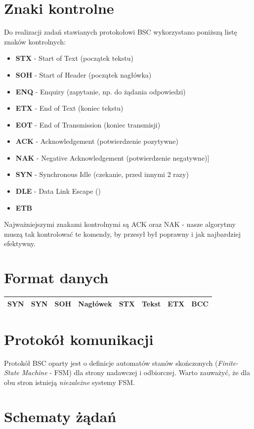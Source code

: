 \documentclass[a4paper,twoside]{article}
\begin{document}
\section{Znaki kontrolne}
Do realizacji zadań stawianych protokołowi BSC wykorzystano poniższą listę znaków kontrolnych:
\begin{itemize}
	\item \textbf{STX} - Start of Text (początek tekstu)
	\item \textbf{SOH} - Start of Header (początek nagłówka)
	\item \textbf{ENQ} - Enquiry (zapytanie, np. do żądania odpowiedzi)
	\item \textbf{ETX} - End of Text (koniec tekstu)
	\item \textbf{EOT} - End of Transmission (koniec transmisji)
	\item \textbf{ACK} - Acknowledgement (potwierdzenie pozytywne)
	\item \textbf{NAK} - Negative Acknowledgement (potwierdzenie negatywne)]
	\item \textbf{SYN} - Synchronous Idle (czekanie, przed innymi 2 razy)
	\item \textbf{DLE} - Data Link Escape ()
	\item \textbf{ETB}
\end{itemize}
Najważniejszymi znakami kontrolnymi są ACK oraz NAK - nasze algorytmy muszą tak kontrolować te komendy, by przesył był poprawny i jak najbardziej efektywny.
\section{Format danych}
\begin{table}[h]
	\begin{tabular}{|c|c|c|c|c|c|c|c|}
		\hline
		SYN	&	SYN	&	SOH	&	Nagłówek	&	STX	& Tekst	&	ETX	&	BCC\\ \hline
	\end{tabular}
\end{table}
\section{Protokół komunikacji}
Protokół BSC oparty jest o definicje automatów stanów skończonych (\emph{Finite-State Machine} - FSM) dla strony nadawczej i odbiorczej. Warto zauważyć, że dla obu stron istnieją \textit{niezależne} systemy FSM.
\section{Schematy żądań}
\end{document}
